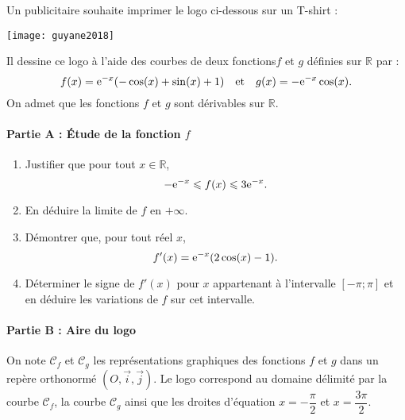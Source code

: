 \documentclass[11pt,fleqn, openany]{book} %
\begin{document}
\begin{exercise}[topic=trig02, subtitle={(Guyane 2018)}]Un publicitaire souhaite imprimer le logo ci-dessous sur un T-shirt : 

\begin{center}
\texttt{[image: guyane2018]}
\end{center}

Il dessine ce logo à l'aide des courbes de deux fonctions$f$ et $g$ définies sur $\mathbb{R}$ par :
\[f(x)=\mathrm{e}^{-x}(-\cos(x)+\sin(x)+1)\quad\text{et}\quad g(x)=-\mathrm{e}^{-x}\cos(x).\]
On admet que les fonctions $f$ et $g$ sont dérivables sur $\mathbb{R}$.

\paragraph{Partie A : Étude de la fonction $f$}

\begin{enumerate}
\item Justifier que pour tout $x\in\mathbb{R}$,
\[-\mathrm{e}^{-x} \leqslant f(x) \leqslant 3\mathrm{e}^{-x}.\]
\item En déduire la limite de $f$ en $+\infty$.
\item Démontrer que, pour tout réel $x$,
\[f'(x)=\mathrm{e}^{-x}(2\cos(x)-1).\]
\item Déterminer le signe de $f'(x)$ pour $x$ appartenant à l'intervalle $[-\pi ; \pi]$ et en déduire les variations de $f$ sur cet intervalle.
\end{enumerate}

\paragraph{Partie B : Aire du logo}

On note $\mathcal{C}_f$ et $\mathcal{C}_g$ les représentations graphiques des fonctions $f$ et $g$ dans un repère orthonormé $(O, \vec i, \vec j)$. Le logo correspond au domaine délimité par la courbe $\mathcal{C}_f$, la courbe $\mathcal{C}_g$ ainsi que les droites d'équation $x=-\dfrac{\pi}{2}$ et $x=\dfrac{3\pi}{2}$.

\begin{center}
\end{center}
\end{exercise}
\end{document}
